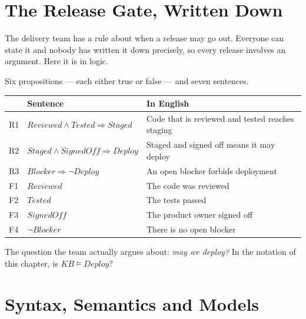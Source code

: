 \section{The Release Gate, Written Down}

The delivery team has a rule about when a release may go out. Everyone can state it
and nobody has written it down precisely, so every release involves an argument.
Here it is in logic.

\begin{examplebox}
Six propositions --- each either true or false --- and seven sentences.

\smallskip
\noindent\begin{tabular}{@{}L{0.9cm}L{6.0cm}L{7.0cm}@{}}
\toprule
 & \textbf{Sentence} & \textbf{In English} \\
\midrule
R1 & $\mathit{Reviewed} \wedge \mathit{Tested} \Rightarrow \mathit{Staged}$ &
Code that is reviewed and tested reaches staging \\
R2 & $\mathit{Staged} \wedge \mathit{SignedOff} \Rightarrow \mathit{Deploy}$ &
Staged and signed off means it may deploy \\
R3 & $\mathit{Blocker} \Rightarrow \neg \mathit{Deploy}$ &
An open blocker forbids deployment \\
F1 & $\mathit{Reviewed}$ & The code was reviewed \\
F2 & $\mathit{Tested}$ & The tests passed \\
F3 & $\mathit{SignedOff}$ & The product owner signed off \\
F4 & $\neg \mathit{Blocker}$ & There is no open blocker \\
\bottomrule
\end{tabular}

\smallskip
The question the team actually argues about: \emph{may we deploy?} In the notation
of this chapter, is $\mathit{KB} \models \mathit{Deploy}$?
\end{examplebox}

\section{Syntax, Semantics and Models}

